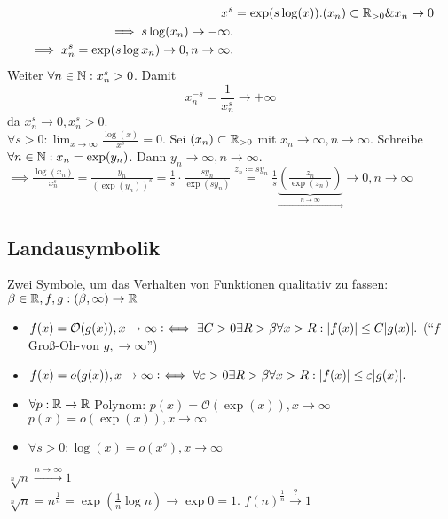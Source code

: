 \begin{align*}
        x^s &= \exp (s \log (x)). (x_n) \subset \mathbb{R}_{>0} \& x_n \to 0 \\
        ~\implies s\log (x_n) \to  -\infty.\\
        ~\implies x_n^s = \exp (s\log x_n) \to 0, n \to \infty.
\end{align*}
Weiter $ \forall n \in \mathbb{N} : x_n^s > 0 $. Damit
\[
        x_n^{-s} = \frac{ 1 }{ x_n^s } \to +\infty
\]
da $ x_n^s \to  0, x_n^s > 0 $.\\
$ \forall s > 0 : \lim_{x \to \infty} \frac{\log(x)}{ x^s } = 0 $.
Sei $ (x_n) \subset \mathbb{R}_{>0} $ mit $ x_n \to \infty, n \to \infty $. Schreibe $ \forall n \in \mathbb{N} : x_n = \exp (y_n) $. Dann $ y_n \to \infty, n\to \infty $.\\
$ \implies \frac{\log (x_n)}{ x_n^s } = \frac{y_n}{ (\exp (y_n))^s } = \frac{ 1 }{ s } \cdot \frac{sy_n}{ \exp (sy_n) } \overset{z_n \coloneqq sy_n}{=} \frac{ 1 }{ s } \underbrace{\left( \frac{z_n}{ \exp (z_n) } \right)}_{\overset{n\to \infty}{\to }} \to 0, n\to \infty $

\subsection{Landausymbolik}
Zwei Symbole, um das Verhalten von Funktionen qualitativ zu fassen: $ \beta \in \mathbb{R} , f, g : (\beta, \infty) \to \mathbb{R}  $ 
\begin{itemize}
	\item $ f(x) = \mathcal{O}(g(x)), x \to \infty \vcentcolon\iff \exists C > 0 \exists R > \beta \forall x > R: |f(x)| \leq C|g(x)|.  $ (``$ f $ Groß-Oh-von $ g, \to \infty $'')
	\item $ f(x) = o(g(x)), x \to \infty \vcentcolon\iff \forall \varepsilon  > 0 \exists R > \beta \forall x > R: |f(x)| \leq \varepsilon |g(x)|.  $ 
\end{itemize}

\begin{itemize}
	\item $ \forall p : \mathbb{R} \to \mathbb{R}  $ Polynom: $ p(x) = \mathcal{O} (\exp (x)), x\to \infty $\\
		$ p(x) = o(\exp(x)), x\to \infty $
	\item $ \forall s>0 : \log (x) = o(x^s), x\to \infty $
\end{itemize}

$ \sqrt[n]{n} \overset{n\to \infty}{\to } 1 $\\
$ \sqrt[n]{n} = n^{\frac{ 1 }{ n } }= \exp \left( \frac{ 1 }{ n } \log n \right) \to \exp 0 = 1 $.
$ f(n)^{\frac{ 1 }{ n } } \overset{?}{\to } 1 $

